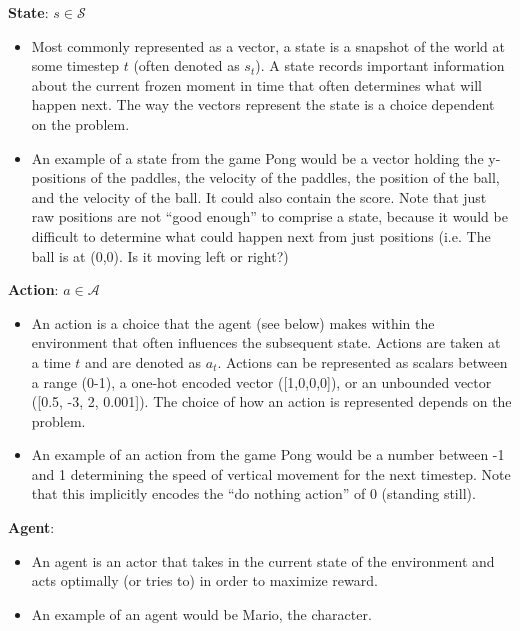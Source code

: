     \textbf{State}: $s \in \mathcal{S}$
    \begin{itemize}
        \item Most commonly represented as a vector, a state is a snapshot of the world at some timestep $t$ (often denoted as $s_t$). A state records important information about the current frozen moment in time that often determines what will happen next. The way the vectors represent the state is a choice dependent on the problem.
        \item An example of a state from the game Pong would be a vector holding the y-positions of the paddles, the velocity of the paddles, the position of the ball, and the velocity of the ball. It could also contain the score. Note that just raw positions are not ``good enough'' to comprise a state, because it would be difficult to determine what could happen next from just positions (i.e. The ball is at (0,0). Is it moving left or right?)
    \end{itemize}

    \textbf{Action}: $a \in \mathcal{A}$
    \begin{itemize}
        \item An action is a choice that the agent (see below) makes within the environment that often influences the subsequent state. Actions are taken at a time $t$ and are denoted as $a_t$. Actions can be represented as scalars between a range (0-1), a one-hot encoded vector ([1,0,0,0]), or an unbounded vector ([0.5, -3, 2, 0.001]). The choice of how an action is represented depends on the problem.
        \item An example of an action from the game Pong would be a number between -1 and 1 determining the speed of vertical movement for the next timestep. Note that this implicitly encodes the ``do nothing action'' of 0 (standing still).
    \end{itemize}

    \textbf{Agent}:
    \begin{itemize}
        \item An agent is an actor that takes in the current state of the environment and acts optimally (or tries to) in order to maximize reward. 
        \item An example of an agent would be Mario, the character.
    \end{itemize}

